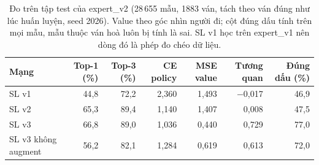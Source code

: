 \begin{table}[H]
  \centering\footnotesize
  \caption{Đo trên tập test của expert\_v2 (28\,655 mẫu, 1883 ván, tách theo ván đúng như lúc huấn luyện, seed 2026). Value theo góc nhìn người đi; cột đúng dấu tính trên mọi mẫu, mẫu thuộc ván hoà luôn bị tính là sai. SL v1 học trên expert\_v1 nên dòng đó là phép đo chéo dữ liệu.}
  \label{tab:sl-test}
  \setlength{\tabcolsep}{4pt}
  \begin{tabular}{@{}lrrrrrr@{}}
    \toprule
    Mạng & Top-1 (\%) & Top-3 (\%) & CE policy & MSE value & Tương quan & Đúng dấu (\%) \\
    \midrule
    SL v1 & 44{,}8 & 72{,}2 & 2{,}360 & 1{,}493 & $-$0{,}017 & 46{,}9 \\
    SL v2 & 65{,}3 & 89{,}4 & 1{,}140 & 1{,}407 & 0{,}008 & 47{,}5 \\
    SL v3 & 66{,}8 & 89{,}0 & 1{,}036 & 0{,}440 & 0{,}729 & 77{,}0 \\
    SL v3 không augment & 56{,}2 & 82{,}1 & 1{,}284 & 0{,}619 & 0{,}613 & 72{,}0 \\
    \bottomrule
  \end{tabular}
\end{table}
